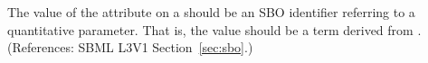 The value of the  attribute on a \Parameter should be an SBO
identifier referring to a quantitative parameter.  That is, the value should
be a term derived from \sboparameter.  (References: SBML
 L3V1 Section~\ref{sec:sbo}.)
